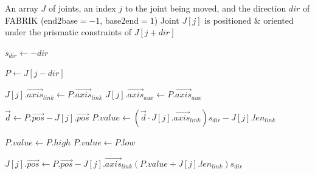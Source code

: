 \begin{algorithm}
\caption{Move Joint under Prismatic Constraints}
\label{alg:move_prismatic}
\footnotesize{
\begin{algorithmic}[1]
    \Require An array $J$ of joints, an index $j$ to the joint being moved, and the direction $dir$ of FABRIK (end2base$=-1$, base2end$=1$)
    \Ensure Joint $J[j]$ is positioned \& oriented under the prismatic constraints of $J[j+dir]$

        \State $s_{dir}\gets -dir$
        \Statex

        \State $P\gets J[j-dir]$
        \Statex

        \State $J[j].\vec{axis}_{link}\gets P.\vec{axis}_{link}$
        \State $J[j].\vec{axis}_{aux}\gets P.\vec{axis}_{aux}$
        \Statex

        \State $\vec{d}\gets P.\vec{pos}-J[j].\vec{pos}$
        \State $P.value\gets(\vec{d}\cdot J[j].\vec{axis}_{link})s_{dir}-J[j].len_{link}$
        \Statex

                \State $P.value\gets P.high$
                \State $P.value\gets P.low$
            \EndIf
        \EndIf
        \Statex
        
        \State $J[j].\vec{pos}\gets P.\vec{pos}-J[j].\vec{axis}_{link}(P.value+J[j].len_{link})s_{dir}$
    \EndFunction
\end{algorithmic}
}
\end{algorithm}
